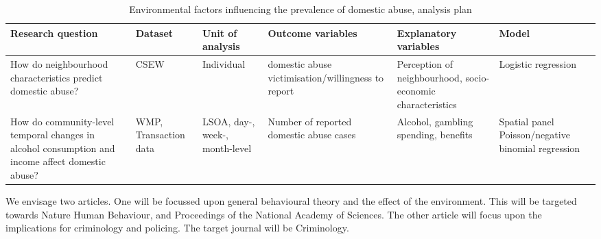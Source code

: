 \documentclass[11pt, a4paper]{article}
\newcommand{\AT}[1] {{\textcolor{blue}{#1}}}
\begin{document}
\begin{table}[!htbp]
\caption{Environmental factors influencing the prevalence of domestic abuse, analysis plan}
  \begin{threeparttable}[t]
  \centering
       \begin{tabular}{ L{4cm}  C{1.2cm}  C{1.6cm}  C{3cm}  C{2.8cm}  C{1.8cm} }
    \toprule
     \textbf{Research question} & \textbf{Dataset}    & \textbf{Unit of analysis} & \textbf{Outcome variables} & \textbf{Explanatory variables} & \textbf{Model} \\
    \midrule
    How do neighbourhood characteristics predict domestic abuse? & CSEW & Individual & domestic abuse victimisation/willingness to report & Perception of neighbourhood, socio-economic characteristics & Logistic regression \\
         \midrule
    How do community-level temporal changes in alcohol consumption and income affect domestic abuse? & WMP, Transaction data & LSOA, day-, week-, month-level & Number of reported domestic abuse cases & Alcohol, gambling spending, benefits & Spatial panel Poisson/negative binomial regression \\

     \bottomrule
  \end{tabular}
    \end{threeparttable}%
  \label{tab:addlabel}%
\end{table}%

We envisage two articles. One will be focussed upon general behavioural theory and the effect of the environment. This will be targeted towards Nature Human Behaviour, and Proceedings of the National Academy of Sciences. The other article will focus upon the implications for criminology and policing. The target journal will be Criminology. 


\newpage

%
%
%
%
%
%
%
%
%
\end{document}
